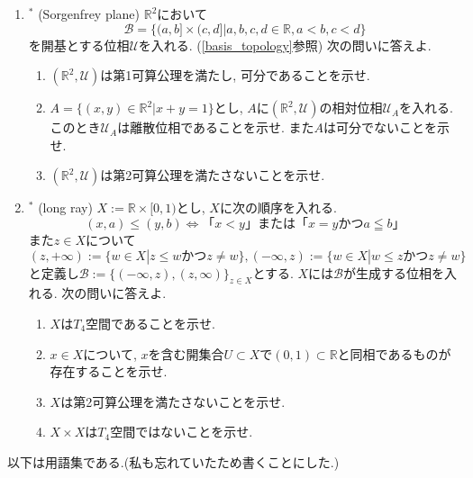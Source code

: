 \documentclass[dvipdfmx,a4paper,11pt]{article}
\newcommand{\R}{\mathbb{R}}
\theoremstyle{definition}
\begin{document}
\begin{enumerate}[label=\textbf{問}\ref*{sec-countable}.\arabic*]
	\setlength{\parskip}{0cm} 
  \setlength{\itemsep}{7pt} 
	
\item  \label{Sor2} $^{*}$ (Sorgenfrey plane) $\R^2$において
$$
\mathscr{B} = \{(a,b] \times (c,d]| a,b,c,d \in \R, a<b, c<d\} 
$$
を開基とする位相$\mathscr{U}$を入れる. (\ref{basis_topology}参照)
次の問いに答えよ. 
	 \begin{enumerate}
	 	\setlength{\parskip}{0cm} 
  \setlength{\itemsep}{0pt} 
	\item $(\R^2,\mathscr{U})$は第1可算公理を満たし, 可分であることを示せ.
	\item $ A=\{ (x,y)\in \R^2 | x+y=1\}$とし, $A$に$(\R^2,\mathscr{U})$の相対位相$\mathscr{U}_A$を入れる. このとき$\mathscr{U}_A$は離散位相であることを示せ. また$A$は可分でないことを示せ.
	\item $(\R^2,\mathscr{U})$は第2可算公理を満たさないことを示せ.
	\end{enumerate}
\item \label{longray}$^{*}$ (long ray) $X:=\R \times [0,1)$とし, $X$に次の順序を入れる.
	$$
(x,a) \le (y,b) \Leftrightarrow \text{「$x<y$」または「$x=y$かつ$a \leqq b$」} 
	$$	
また$z \in X$について
$$(z, +\infty):=\{ w \in X| z \le w \text{かつ} z \neq w\}, 
(-\infty, z):=\{ w \in X| w \le z \text{かつ} z \neq w\}$$
と定義し$\mathcal{B} := \{ (-\infty, z),  (z, \infty)\}_{z \in X}$とする. 
$X$には$\mathcal{B}$が生成する位相を入れる. 
次の問いに答えよ.
 \begin{enumerate}
 	\setlength{\parskip}{0cm} 
  \setlength{\itemsep}{0pt} 
 \item $X$は$T_4$空間であることを示せ.
\item $x \in X$について, $x$を含む開集合$U \subset X$で$(0,1) \subset \R$と同相であるものが存在することを示せ.
\item $X$は第2可算公理を満たさないことを示せ.
\item $X \times X$は$T_4$空間ではないことを示せ.
\end{enumerate}

\end{enumerate}

\medskip
以下は用語集である.(私も忘れていたため書くことにした.)
\end{document}
